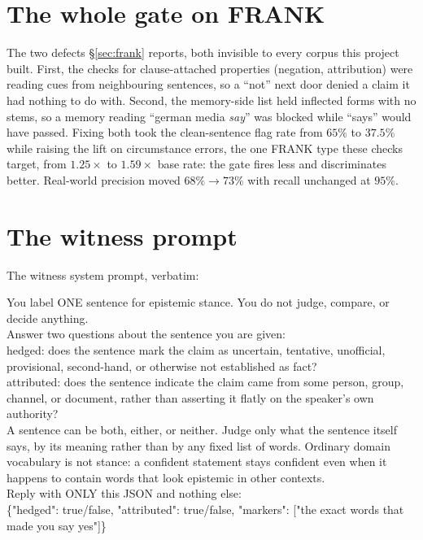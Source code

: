 \documentclass[11pt]{article}
\begin{document}
\section{The whole gate on FRANK}
\label{app:frank}

The two defects \S\ref{sec:frank} reports, both invisible to every corpus this project
built. First, the checks for clause-attached properties (negation, attribution) were
reading cues from neighbouring sentences, so a ``not'' next door denied a claim it had
nothing to do with. Second, the memory-side list held inflected forms with no stems, so
a memory reading ``german media \emph{say}'' was blocked while ``says'' would have
passed. Fixing both took the clean-sentence flag rate from $65\%$ to $37.5\%$ while
raising the lift on circumstance errors, the one FRANK type these checks target, from
$1.25\times$ to $1.59\times$ base rate: the gate fires less and discriminates better.
Real-world precision moved $68\%\to73\%$ with recall unchanged at $95\%$.

\section{The witness prompt}
\label{app:prompts}

The witness system prompt, verbatim:

\begin{promptbox}
You label ONE sentence for epistemic stance. You do not judge, compare, or decide
anything.\\[4pt]
Answer two questions about the sentence you are given:\\[4pt]
hedged: does the sentence mark the claim as uncertain, tentative, unofficial,
provisional, second-hand, or otherwise not established as fact?\\[4pt]
attributed: does the sentence indicate the claim came from some person, group, channel,
or document, rather than asserting it flatly on the speaker's own authority?\\[4pt]
A sentence can be both, either, or neither. Judge only what the sentence itself says, by
its meaning rather than by any fixed list of words. Ordinary domain vocabulary is not
stance: a confident statement stays confident even when it happens to contain words that
look epistemic in other contexts.\\[4pt]
Reply with ONLY this JSON and nothing else:\\
\{"hedged": true/false, "attributed": true/false, "markers": ["the exact words that made
you say yes"]\}
\end{promptbox}
\end{document}
